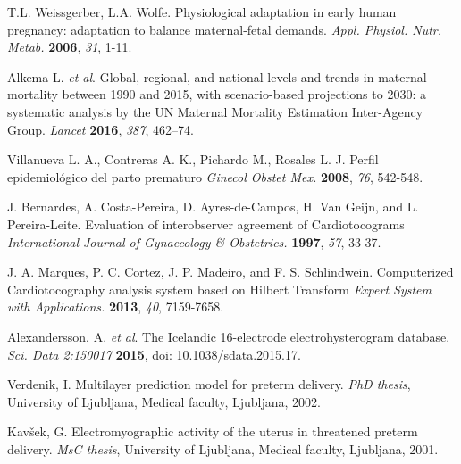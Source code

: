 \documentclass[bioengineering,article,submit,moreauthors,pdftex,10pt,a4paper]{mdpi}
\begin{document}
\begin{thebibliography}{999}
	
T.L. Weissgerber, L.A. Wolfe. Physiological adaptation in early human pregnancy: adaptation to balance maternal-fetal demands. {\em Appl. Physiol. Nutr. Metab.} {\bf 2006}, {\em 31}, 1-11.

Alkema L. {\em et al}. Global, regional, and national levels and trends in maternal mortality between 1990 and 2015, with scenario-based projections to 2030: a systematic analysis by the UN Maternal Mortality Estimation Inter-Agency Group. {\em Lancet} {\bf 2016}, {\em 387}, 462–74.

Villanueva L. A., Contreras A. K., Pichardo M., Rosales L. J. Perfil epidemiológico del parto prematuro {\em Ginecol Obstet Mex.} {\bf 2008}, {\em 76}, 542-548. 

J. Bernardes, A. Costa-Pereira, D. Ayres-de-Campos, H. Van Geijn, and L. Pereira-Leite. Evaluation of interobserver agreement of Cardiotocograms {\em International Journal of Gynaecology \& Obstetrics.} {\bf 1997}, {\em 57}, 33-37.

J. A. Marques, P. C. Cortez, J. P. Madeiro, and F. S. Schlindwein. Computerized Cardiotocography analysis system based on Hilbert Transform {\em Expert System with Applications.} {\bf 2013}, {\em 40}, 7159-7658.		
	
Alexandersson, A. { \em et al}.  The Icelandic 16-electrode electrohysterogram database. {\em Sci. Data 2:150017} {\bf 2015}, doi: 10.1038/sdata.2015.17.

Verdenik, I.  Multilayer prediction model for preterm delivery. {\em PhD thesis}, University of Ljubljana, Medical faculty, Ljubljana, 2002.

Kavšek, G.  Electromyographic activity of the uterus in threatened preterm delivery. {\em MsC thesis}, University of Ljubljana, Medical faculty, Ljubljana, 2001.



\end{thebibliography}
\end{document}
